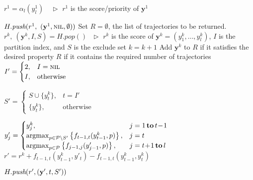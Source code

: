 \begin{algorithm}[htbp]
\begin{algorithmic}[1]
\STATE $r^1 = \alpha_{l}(y_l^1) \hspace{1em}\triangleright$ $r^1$ is the score/priority of $\mathbf{y}^1$

\STATE $H.\textit{push}(r^1,~ (\mathbf{y}^1, \textsc{nil}, \emptyset) )$
\STATE Set $R=\emptyset$, the list of trajectories to be returned.
    \STATE $r^k,~ (\mathbf{y}^k, I, S) = H.\textit{pop}()~~~ \triangleright$
           $r^k$ is the score of $\mathbf{y}^k=(y_1^k,\dots,y_l^k)$, $I$ is the partition index, and $S$ is the exclude set
    \STATE $k = k + 1$
    \STATE Add $\mathbf{y}^k$ to $R$ if it satisfies the desired property
    \RETURN $R$ if it contains the required number of trajectories
    \STATE $I' = \begin{cases}
                  2, & I = \textsc{nil} \\
                  I, & \text{otherwise}
                 \end{cases}$

        \STATE $S' = \begin{cases}
                      S \cup \{ y_t^k \}, & t = I' \\
                      \{ y_t^k \},        & \text{otherwise}
                     \end{cases}$

        \STATE $y'_j = \begin{cases}
                            y_j^k,                                                                             & j=1 \, \textbf{to} \, t\!-\!1 \\
                            \operatorname*{argmax}_{p \in \mathcal{P} \setminus S'} \left\{ f_{t-1,t}(y_{t-1}^k, p) \right\}, & j=t \\
                            \operatorname*{argmax}_{p \in \mathcal{P}} \left\{ f_{j-1, j}(y'_{j-1}, p) \right\},              & j=t\!+\!1 \, \textbf{to} \, l
                \end{cases}$
        \STATE $r' = r^k + f_{t-1,t}(y_{t-1}^k, y'_t) - f_{t-1,t}(y_{t-1}^k, y_t^k)$

        \STATE $H.\textit{push}(r', (\mathbf{y}', t, S') )$ 
    \ENDFOR
\ENDWHILE
\end{algorithmic}
\end{algorithm}



